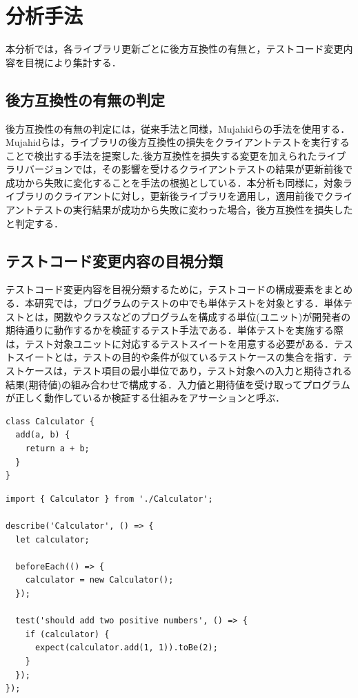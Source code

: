 \documentclass[11pt,dvipdfmx]{jreport}
\begin{document}
\section{分析手法}
本分析では，各ライブラリ更新ごとに後方互換性の有無と，テストコード変更内容を目視により集計する．

\subsection{後方互換性の有無の判定}\label{subsec:kouhougokanseinohantei}
後方互換性の有無の判定には，従来手法と同様，Mujahidらの手法を使用する．Mujahidらは，ライブラリの後方互換性の損失をクライアントテストを実行することで検出する手法を提案した\cite{mujahid}.後方互換性を損失する変更を加えられたライブラリバージョンでは，その影響を受けるクライアントテストの結果が更新前後で成功から失敗に変化することを手法の根拠としている．本分析も同様に，対象ライブラリのクライアントに対し，更新後ライブラリを適用し，適用前後でクライアントテストの実行結果が成功から失敗に変わった場合，後方互換性を損失したと判定する．

\subsection{テストコード変更内容の目視分類}
テストコード変更内容を目視分類するために，テストコードの構成要素をまとめる．本研究では，プログラムのテストの中でも単体テストを対象とする．単体テストとは，関数やクラスなどのプログラムを構成する単位(ユニット)が開発者の期待通りに動作するかを検証するテスト手法である．単体テストを実施する際は，テスト対象ユニットに対応するテストスイートを用意する必要がある．テストスイートとは，テストの目的や条件が似ているテストケースの集合を指す．テストケースは，テスト項目の最小単位であり，テスト対象への入力と期待される結果(期待値)の組み合わせで構成する．入力値と期待値を受け取ってプログラムが正しく動作しているか検証する仕組みをアサーションと呼ぶ．

\begin{lstlisting}[caption=Calculator.js, label=Calculator.js]
class Calculator {
  add(a, b) {
    return a + b;
  }
}
\end{lstlisting}

\begin{lstlisting}[caption=Calculator.test.js, label=Calculator.test.js]
import { Calculator } from './Calculator';

describe('Calculator', () => {
  let calculator;

  beforeEach(() => {
    calculator = new Calculator();
  });

  test('should add two positive numbers', () => {
    if (calculator) {
      expect(calculator.add(1, 1)).toBe(2);
    }
  });
});
\end{lstlisting}
\end{document}
